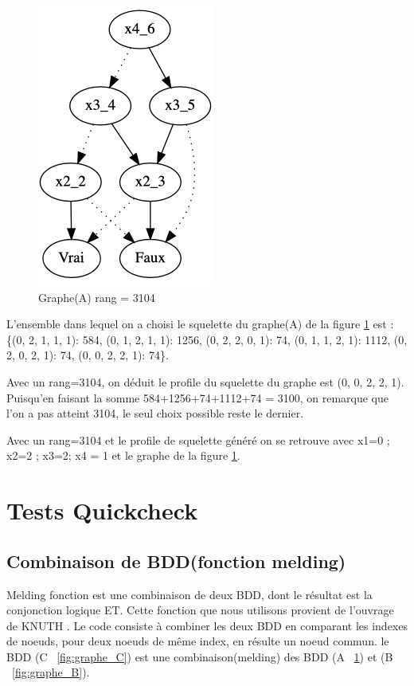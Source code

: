 \documentclass[french]{article}
\begin{document}
\begin{figure}[h!]
    \centering
    \includegraphics[scale=0.5]{arb_3104.png}
    \caption{Graphe(A) rang = 3104}
    \label{fig:graphe_A}
\end{figure}
L'ensemble dans lequel on a choisi le squelette du graphe(A) de la figure \ref{fig:graphe_A} est : \{(0, 2, 1, 1, 1): 584, (0, 1, 2, 1, 1): 1256, (0, 2, 2, 0, 1): 74, (0, 1, 1, 2, 1): 1112, (0, 2, 0, 2, 1): 74, (0, 0, 2, 2, 1): 74\}.

Avec un rang=3104, on déduit le profile du squelette du graphe est (0, 0, 2, 2, 1). Puisqu'en faisant la somme 584+1256+74+1112+74 = 3100, on remarque que l'on a pas atteint 3104, le seul choix possible reste le dernier.

Avec un rang=3104 et le profile de squelette généré on se retrouve avec {x1=0 ; x2=2  ; x3=2; x4 = 1} et le graphe de la figure \ref{fig:graphe_A}.

\section{Tests Quickcheck}

\subsection{Combinaison de BDD(fonction melding)}
Melding fonction est une combinaison de deux BDD, dont le résultat est la conjonction logique ET. Cette fonction que nous utilisons provient de l'ouvrage de KNUTH \cite{knuth}. Le code consiste à combiner les deux BDD en comparant les indexes de noeuds, pour deux noeuds de même index, en résulte un noeud commun. le BDD 
(C ~\ref{fig:graphe_C}) est une combinaison(melding) des BDD (A ~\ref{fig:graphe_A}) et (B ~\ref{fig:graphe_B}).
\end{document}
